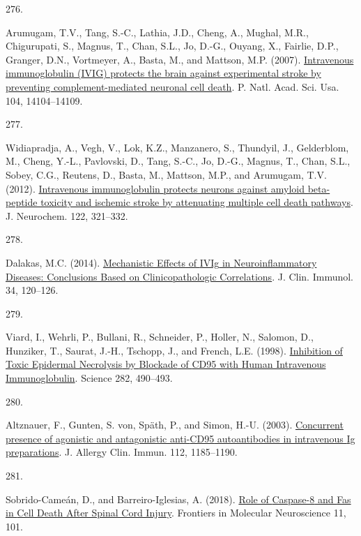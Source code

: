 \documentclass[
]{article}
\newlength{\cslhangindent}
\newlength{\csllabelwidth}
\newlength{\cslentryspacingunit} %
\newenvironment{CSLReferences}[2] %
 {%
  \setlength{\parindent}{0pt}
  \ifodd #1
  \let\oldpar\par
  \def\par{\hangindent=\cslhangindent\oldpar}
  \fi
  \setlength{\parskip}{#2\cslentryspacingunit}
 }%
 {}
\newcommand{\CSLLeftMargin}[1]{\parbox[t]{\csllabelwidth}{#1}}
\newcommand{\CSLRightInline}[1]{\parbox[t]{\linewidth - \csllabelwidth}{#1}\break}
\begin{document}
\begin{CSLReferences}{0}{0}
\leavevmode{}%
\CSLLeftMargin{276. }
\CSLRightInline{Arumugam, T.V., Tang, S.-C., Lathia, J.D., Cheng, A., Mughal, M.R., Chigurupati, S., Magnus, T., Chan, S.L., Jo, D.-G., Ouyang, X., Fairlie, D.P., Granger, D.N., Vortmeyer, A., Basta, M., and Mattson, M.P. (2007). \href{https://doi.org/10.1073/pnas.0700506104}{Intravenous immunoglobulin ({IVIG}) protects the brain against experimental stroke by preventing complement-mediated neuronal cell death}. P. Natl. Acad. Sci. Usa. 104, 14104--14109.}

\leavevmode{}%
\CSLLeftMargin{277. }
\CSLRightInline{Widiapradja, A., Vegh, V., Lok, K.Z., Manzanero, S., Thundyil, J., Gelderblom, M., Cheng, Y.-L., Pavlovski, D., Tang, S.-C., Jo, D.-G., Magnus, T., Chan, S.L., Sobey, C.G., Reutens, D., Basta, M., Mattson, M.P., and Arumugam, T.V. (2012). \href{https://doi.org/10.1111/j.1471-4159.2012.07754.x}{Intravenous immunoglobulin protects neurons against amyloid beta-peptide toxicity and ischemic stroke by attenuating multiple cell death pathways}. J. Neurochem. 122, 321--332.}

\leavevmode{}%
\CSLLeftMargin{278. }
\CSLRightInline{Dalakas, M.C. (2014). \href{https://doi.org/10.1007/s10875-014-0024-5}{Mechanistic {Effects} of {IVIg} in {Neuroinflammatory Diseases}: {Conclusions Based} on {Clinicopathologic Correlations}}. J. Clin. Immunol. 34, 120--126.}

\leavevmode{}%
\CSLLeftMargin{279. }
\CSLRightInline{Viard, I., Wehrli, P., Bullani, R., Schneider, P., Holler, N., Salomon, D., Hunziker, T., Saurat, J.-H., Tschopp, J., and French, L.E. (1998). \href{https://doi.org/10.1126/science.282.5388.490}{Inhibition of {Toxic Epidermal Necrolysis} by {Blockade} of {CD95} with {Human Intravenous Immunoglobulin}}. Science 282, 490--493.}

\leavevmode{}%
\CSLLeftMargin{280. }
\CSLRightInline{Altznauer, F., Gunten, S. von, Späth, P., and Simon, H.-U. (2003). \href{https://doi.org/10.1016/j.jaci.2003.09.045}{Concurrent presence of agonistic and antagonistic anti-{CD95} autoantibodies in intravenous {Ig} preparations}. J. Allergy Clin. Immun. 112, 1185--1190.}

\leavevmode{}%
\CSLLeftMargin{281. }
\CSLRightInline{Sobrido-Cameán, D., and Barreiro-Iglesias, A. (2018). \href{https://doi.org/10.3389/fnmol.2018.00101}{Role of {Caspase-8} and {Fas} in {Cell Death After Spinal Cord Injury}}. Frontiers in Molecular Neuroscience 11, 101.}


\end{CSLReferences}
\end{document}
